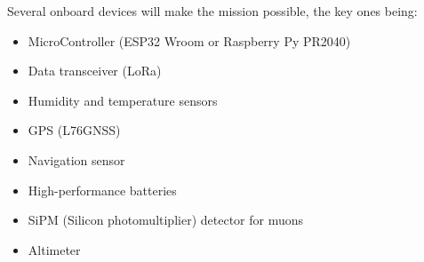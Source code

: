 Several onboard devices will make the mission possible, the key ones being:
    \begin{multicols}{2}[\vspace{-0.5\baselineskip}]
        \begin{itemize}[leftmargin=1.75cm,itemindent=0cm, noitemsep, topsep=2pt, label=\faCheck]
            \item[\faMicrochip] MicroController (ESP32 Wroom or Raspberry Py PR2040)
            \item[ \faWifi] Data transceiver (LoRa)
            \item[\faThermometerQuarter] Humidity and temperature sensors %
            \item[\faMapMarked] GPS (L76GNSS)
            \item[\faCompass] Navigation sensor %
            \item[\faBatteryHalf] High-performance batteries
            \item[\faRadiation] SiPM (Silicon photomultiplier) detector for muons
            \item[\newaltitudeicon] Altimeter %
        \end{itemize}
        \vspace*{-0.75\baselineskip}
    \end{multicols}




